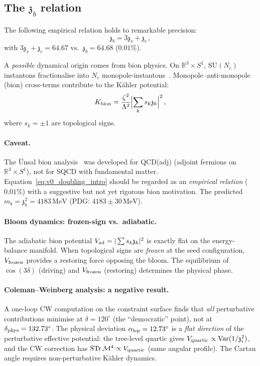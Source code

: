 \documentclass[12pt,a4paper]{article}
\newcommand{\SU}{\mathrm{SU}}
\newcommand{\Nc}{N_{\!c}}
\newcommand{\MeV}{\,\mathrm{MeV}}
\newcommand{\zch}{\mathfrak{z}}
\begin{document}
\subsection{The $\zch_b$ relation}

The following empirical relation holds to remarkable precision:
\begin{equation}
  \boxed{\zch_b = 3\zch_s + \zch_c\,,}
  \label{eq:v0_doubling_intro}
\end{equation}
with $3\zch_s + \zch_c = 64.67$ vs.\ $\zch_b = 64.68$
($0.01\%$).

A \emph{possible} dynamical origin comes from bion physics.
On $\mathbb{R}^3 \times S^1$, $\SU(\Nc)$ instantons
fractionalise into $\Nc$
monopole-instantons~\cite{Unsal:2008}.
Monopole--anti-monopole (bion) cross-terms contribute to the
K\"ahler potential:
\begin{equation}
  K_{\rm bion} = \frac{\zeta^2}{\Lambda^2}
  \Bigl|\sum_k s_k \zch_k\Bigr|^2\,,
  \label{eq:Kbion}
\end{equation}
where $s_k = \pm 1$ are topological signs.

\paragraph{Caveat.}
The \"Unsal bion analysis~\cite{Unsal:2008} was developed for
QCD(adj) (adjoint fermions on $\mathbb{R}^3 \times S^1$), not
for SQCD with fundamental matter.
Equation~\eqref{eq:v0_doubling_intro} should be regarded as an
\emph{empirical relation} ($0.01\%$) with a suggestive but not
yet rigorous bion motivation.
The predicted $m_b = \zch_b^2 = 4183\MeV$
(PDG: $4183 \pm 30\MeV$).

\paragraph{Bloom dynamics: frozen-sign vs.\ adiabatic.}
The adiabatic bion potential
$V_{\rm ad} = |\sum s_k \zch_k|^2$ is exactly flat on the
energy-balance manifold.
When topological signs are \emph{frozen} at the seed
configuration, $V_{\rm frozen}$ provides a restoring force
opposing the bloom.
The equilibrium of $\cos(3\delta)$ (driving) and
$V_{\rm frozen}$ (restoring) determines the physical phase.

\paragraph{Coleman--Weinberg analysis: a negative result.}
A one-loop CW computation on the constraint surface finds that
\emph{all} perturbative contributions minimise at
$\delta = 120^\circ$ (the ``democratic'' point), not at
$\delta_{\rm phys} = 132.73^\circ$.
The physical deviation $\alpha_{\rm lep} = 12.73^\circ$ is a
\emph{flat direction} of the perturbative effective potential:
the tree-level quartic gives
$V_{\rm quartic} \propto \mathrm{Var}(1/\zch_i^2)$, and the CW
correction has $\mathrm{STr}\,\mathcal{M}^4 \propto V_{\rm quartic}$
(same angular profile).
The Cartan angle requires non-perturbative K\"ahler dynamics.
\end{document}
